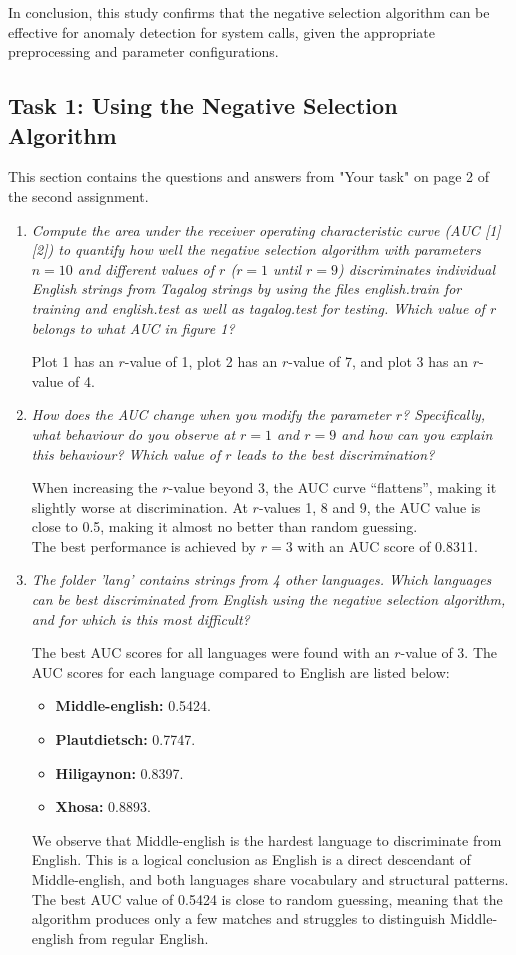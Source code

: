 \documentclass{article}
\begin{document}
In conclusion, this study confirms that the negative selection algorithm can be effective for anomaly detection for system calls, given the appropriate preprocessing and parameter configurations.  
\newpage

\begin{appendices}
\section*{Task 1: Using the Negative Selection Algorithm}
This section contains the questions and answers from "Your task" on page 2 of the second assignment.
\begin{enumerate}[listparindent=\parindent]
    \item \textit{Compute the area under the receiver operating characteristic curve (AUC [1][2]) to quantify how well the negative selection algorithm with parameters $n = 10$ and different values of $r$ ($r = 1$ until $r = 9$) discriminates 
    individual English strings from Tagalog strings by using the files english.train for training and english.test as well as tagalog.test for testing. Which value of $r$ belongs to what AUC in figure 1?}
    
    Plot 1 has an $r$-value of 1, plot 2 has an $r$-value of 7, and plot 3 has an $r$-value of 4.
    \item \textit{How does the AUC change when you modify the parameter $r$? Specifically, what behaviour do you observe at $r = 1$ and $r = 9$ and how can you explain this behaviour? Which value of $r$ leads to the best discrimination?}

    When increasing the $r$-value beyond 3, the AUC curve “flattens”, making it slightly worse at discrimination. At $r$-values 1, 8 and 9, the AUC value is close to 0.5, making it almost no better than random guessing.\\ The best performance is achieved by $r = 3$ with an AUC score of 0.8311.
    \item \textit{The folder 'lang' contains strings from 4 other languages. Which languages can be best discriminated from English using the negative selection algorithm, and for which is this most difficult?}
    
    The best AUC scores for all languages were found with an $r$-value of 3. The AUC scores for each language compared to English are listed below:
    \begin{itemize}
        \item \textbf{Middle-english:} 0.5424.
        \item \textbf{Plautdietsch: }0.7747.
        \item \textbf{Hiligaynon:} 0.8397.
        \item \textbf{Xhosa:} 0.8893.
    \end{itemize}
    We observe that Middle-english is the hardest language to discriminate from English. This is a logical conclusion as English is a direct descendant of Middle-english, and both languages share vocabulary and structural patterns.  
    The best AUC value of 0.5424 is close to random guessing, meaning that the algorithm produces only a few matches and struggles to distinguish Middle-english from regular English.


\end{enumerate}
\end{appendices}
\end{document}
